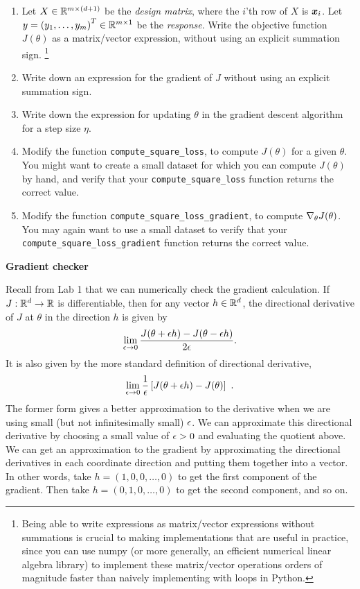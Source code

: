 \documentclass{article}
\newcommand{\nyuparagrah}[1]{\textcolor{nyupurple}{\large #1}}
\begin{document}
\begin{enumerate}
  \setcounter{enumi}{\value{saveenum}}
\item Let $X\in\mathbb{R}^{m\times\left(d+1\right)}$ be the \emph{design matrix}, where the $i$'th row of $X$ is $\boldsymbol{x}_{i}$. Let $y=\left(y_{1},\ldots,y_{m}\right)^{T}\in\mathbb{R}^{m\times1}$
be the \emph{response}. Write the objective function $J(\theta)$ as
a matrix/vector expression, without using an explicit summation sign.
\footnote{Being able to write expressions as matrix/vector expressions without
summations is crucial to making implementations that are useful in
practice, since you can use numpy (or more generally, an efficient
numerical linear algebra library) to implement these matrix/vector
operations orders of magnitude faster than naively implementing with
loops in Python.} 

\item Write down an expression for the gradient of $J$ without using an explicit summation sign. 

\item Write down the expression for updating $\theta$ in the gradient descent
algorithm for a step size $\eta$.

\item Modify the function \texttt{compute\_square\_loss}, to compute $J(\theta)$
for a given $\theta$. You might want to create a small dataset for
which you can compute $J(\theta)$ by hand, and verify that your \texttt{compute\_square\_loss}
function returns the correct value.

\item Modify the function \texttt{compute\_square\_loss\_gradient}, to compute
$\nabla_{\theta}J(\theta)$. You may again want to use a small dataset
to verify that your \texttt{compute\_square\_loss\_gradient} function
returns the correct value.
\setcounter{saveenum}{\value{enumi}}
\end{enumerate}

\nyuparagrah{\bf Gradient checker}

Recall from Lab 1 that we can numerically check the
gradient calculation. If $J:\mathbb{R}^{d}\to\mathbb{R}$ is differentiable,
then for any vector $h\in\mathbb{R}^{d}$, the directional derivative
of $J$ at $\theta$ in the direction $h$ is given by
\[
\lim_{{\epsilon}\to0}\frac{J(\theta+{\epsilon} h)-J(\theta-{\epsilon} h)}{2{\epsilon}}.
\]
It is also given by the more standard definition of directional
derivative, $$\lim_{{\epsilon}\to0}\frac{1}{{\epsilon}}\left[J(\theta+{\epsilon} h)-J(\theta)\right] \ .$$
The former form gives a better approximation to the derivative when
we are using small (but not infinitesimally small) ${\epsilon}$. We can approximate this directional derivative by choosing a small
value of ${\epsilon}>0$ and evaluating the quotient above. We can get an
approximation to the gradient by approximating the directional derivatives
in each coordinate direction and putting them together into a vector.
In other words, take $h=\left(1,0,0,\ldots,0\right)$ to get the first
component of the gradient. Then take $h=(0,1,0,\ldots,0)$ to get
the second component, and so on. 
\end{document}
